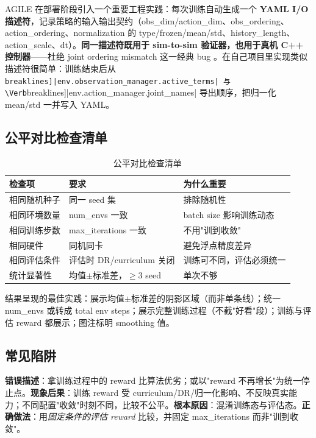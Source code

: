 AGILE 在部署阶段引入一个重要工程实践：每次训练自动生成一个 \textbf{YAML I/O 描述符}，记录策略的输入输出契约（obs\_dim/action\_dim、obs\_ordering、action\_ordering、normalization 的 type/frozen/mean/std、history\_length、action\_scale、dt）。\textbf{同一描述符既用于 sim-to-sim 验证器，也用于真机 C++ 控制器}——杜绝 joint ordering mismatch 这一经典 bug \cite{nvidia2026agile}。在自己项目里实现类似描述符很简单：训练结束后从 \Verb[breaklines]|env.observation_manager.active_terms| 与 \Verb[breaklines]|env.action_manager.joint_names| 导出顺序，把归一化 mean/std 一并写入 YAML。

\subsection{公平对比检查清单}

\begin{table}[H]
\centering
\caption{公平对比检查清单}
\label{tab:rlmc-diag-fair}
\begin{tabular}{p{3.2cm}p{4.2cm}p{4.4cm}}
\hline
检查项 & 要求 & 为什么重要 \\
\hline
相同随机种子 & 同一 seed 集 & 排除随机性 \\
相同环境数量 & num\_envs 一致 & batch size 影响训练动态 \\
相同训练步数 & max\_iterations 一致 & 不用"训到收敛" \\
相同硬件 & 同机同卡 & 避免浮点精度差异 \\
相同评估条件 & 评估时 DR/curriculum 关闭 & 训练可不同，评估必须统一 \\
统计显著性 & 均值$\pm$标准差，$\ge 3$ seed & 单次不够 \\
\hline
\end{tabular}
\end{table}

结果呈现的最佳实践：展示均值$\pm$标准差的阴影区域（而非单条线）；统一 num\_envs 或转成 total env steps；展示完整训练过程（不截"好看"段）；训练与评估 reward 都展示；图注标明 smoothing 值。

\subsection{常见陷阱}

\begin{pitfall}
\textbf{错误描述}：拿训练过程中的 reward 比算法优劣；或以"reward 不再增长"为统一停止点。\textbf{现象后果}：训练 reward 受 curriculum/DR/归一化影响、不反映真实能力；不同配置"收敛"时刻不同，比较不公平。\textbf{根本原因}：混淆训练态与评估态。\textbf{正确做法}：用\emph{固定条件的评估 reward} 比较，并固定 max\_iterations 而非"训到收敛"。
\end{pitfall}

